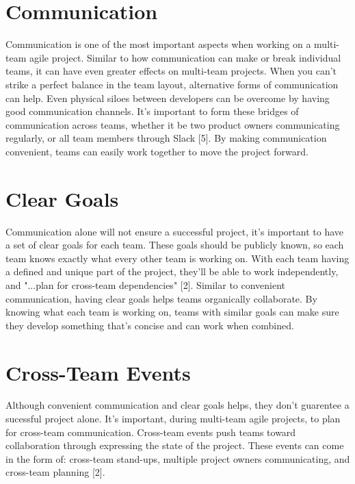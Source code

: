 \documentclass[sigplan,screen]{acmart}
\begin{document}
\section{Communication}
Communication is one of the most important aspects when working on a multi-team agile project.
Similar to how communication can make or break individual teams, it can have even greater effects on multi-team projects.
When you can't strike a perfect balance in the team layout, alternative forms of communication can help.
Even physical siloes between developers can be overcome by having good communication channels.
It's important to form these bridges of communication across teams, whether it be two product owners communicating regularly, or all team members through Slack [5].
By making communication convenient, teams can easily work together to move the project forward.

\section{Clear Goals}
Communication alone will not ensure a successful project, it's important to have a set of clear goals for each team.
These goals should be publicly known, so each team knows exactly what every other team is working on.
With each team having a defined and unique part of the project, they'll be able to work independently, and "...plan for cross-team dependencies" [2]. 
Similar to convenient communication, having clear goals helps teams organically collaborate.
By knowing what each team is working on, teams with similar goals can make sure they develop something that's concise and can work when combined.

\section{Cross-Team Events}
Although convenient communication and clear goals helps, they don't guarentee a sucessful project alone.
It's important, during multi-team agile projects, to plan for cross-team communication.
Cross-team events push teams toward collaboration through expressing the state of the project.
These events can come in the form of: cross-team stand-ups, multiple project owners communicating, and cross-team planning [2].
\end{document}
